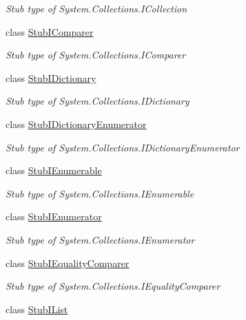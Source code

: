 \begin{DoxyCompactItemize}
\begin{DoxyCompactList}\small\item\em Stub type of System.\-Collections.\-I\-Collection\end{DoxyCompactList}\item 
class \hyperlink{class_system_1_1_collections_1_1_fakes_1_1_stub_i_comparer}{Stub\-I\-Comparer}
\begin{DoxyCompactList}\small\item\em Stub type of System.\-Collections.\-I\-Comparer\end{DoxyCompactList}\item 
class \hyperlink{class_system_1_1_collections_1_1_fakes_1_1_stub_i_dictionary}{Stub\-I\-Dictionary}
\begin{DoxyCompactList}\small\item\em Stub type of System.\-Collections.\-I\-Dictionary\end{DoxyCompactList}\item 
class \hyperlink{class_system_1_1_collections_1_1_fakes_1_1_stub_i_dictionary_enumerator}{Stub\-I\-Dictionary\-Enumerator}
\begin{DoxyCompactList}\small\item\em Stub type of System.\-Collections.\-I\-Dictionary\-Enumerator\end{DoxyCompactList}\item 
class \hyperlink{class_system_1_1_collections_1_1_fakes_1_1_stub_i_enumerable}{Stub\-I\-Enumerable}
\begin{DoxyCompactList}\small\item\em Stub type of System.\-Collections.\-I\-Enumerable\end{DoxyCompactList}\item 
class \hyperlink{class_system_1_1_collections_1_1_fakes_1_1_stub_i_enumerator}{Stub\-I\-Enumerator}
\begin{DoxyCompactList}\small\item\em Stub type of System.\-Collections.\-I\-Enumerator\end{DoxyCompactList}\item 
class \hyperlink{class_system_1_1_collections_1_1_fakes_1_1_stub_i_equality_comparer}{Stub\-I\-Equality\-Comparer}
\begin{DoxyCompactList}\small\item\em Stub type of System.\-Collections.\-I\-Equality\-Comparer\end{DoxyCompactList}\item 
class \hyperlink{class_system_1_1_collections_1_1_fakes_1_1_stub_i_list}{Stub\-I\-List}

\end{DoxyCompactItemize}
